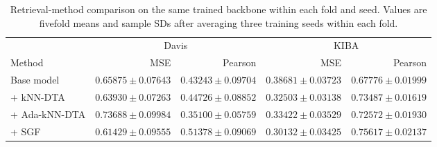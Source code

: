 \begin{table}[htbp]
\centering
\caption{Retrieval-method comparison on the same trained backbone within each fold and seed. Values are fivefold means and sample SDs after averaging three training seeds within each fold.}
\label{tab:knn_controlled}
\small
\begin{tabular}{lrrrr}
\toprule
& \multicolumn{2}{c}{Davis} & \multicolumn{2}{c}{KIBA} \\
\cmidrule(lr){2-3}\cmidrule(lr){4-5}
Method & MSE & Pearson & MSE & Pearson \\
\midrule
Base model & $0.65875 \pm 0.07643$ & $0.43243 \pm 0.09704$ & $0.38681 \pm 0.03723$ & $0.67776 \pm 0.01999$ \\
+ kNN-DTA & $0.63930 \pm 0.07263$ & $0.44726 \pm 0.08852$ & $0.32503 \pm 0.03138$ & $0.73487 \pm 0.01619$ \\
+ Ada-kNN-DTA & $0.73688 \pm 0.09984$ & $0.35100 \pm 0.05759$ & $0.33422 \pm 0.03529$ & $0.72572 \pm 0.01930$ \\
+ SGF & $0.61429 \pm 0.09555$ & $0.51378 \pm 0.09069$ & $0.30132 \pm 0.03425$ & $0.75617 \pm 0.02137$ \\
\bottomrule
\end{tabular}
\end{table}
